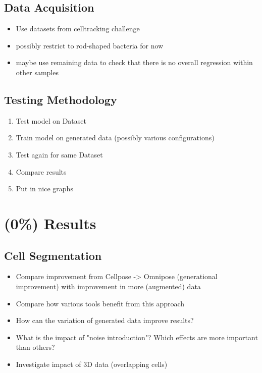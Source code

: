 \documentclass{article}
\begin{document}
\subsection{Data Acquisition}
\begin{itemize}
    \item Use datasets from celltracking challenge
    \item possibly restrict to rod-shaped bacteria for now
    \item maybe use remaining data to check that there is no overall regression within other samples
\end{itemize}
\subsection{Testing Methodology}
\begin{enumerate}
    \item Test model on Dataset
    \item Train model on generated data (possibly various configurations)
    \item Test again for same Dataset
    \item Compare results
    \item Put in nice graphs
\end{enumerate}

\section{(0\%) Results}
\subsection{Cell Segmentation}
\begin{itemize}
    \item Compare improvement from Cellpose -> Omnipose (generational improvement) with improvement
        in more (augmented) data
    \item Compare how various tools benefit from this approach
    \item How can the variation of generated data improve results?
    \item What is the impact of "noise introduction"? Which effects are more important than others?
    \item Investigate impact of 3D data (overlapping cells)
\end{itemize}
\end{document}
